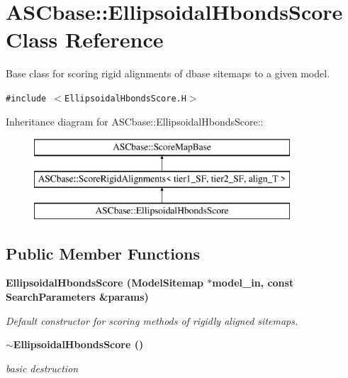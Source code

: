 \section{ASCbase::Ellipsoidal\-Hbonds\-Score Class Reference}
\label{classASCbase_1_1EllipsoidalHbondsScore}
Base class for scoring rigid alignments of dbase sitemaps to a given model.  


{\tt \#include $<$Ellipsoidal\-Hbonds\-Score.H$>$}

Inheritance diagram for ASCbase::Ellipsoidal\-Hbonds\-Score::\begin{figure}[H]
\begin{center}
\leavevmode
\includegraphics[height=3cm]{classASCbase_1_1EllipsoidalHbondsScore}
\end{center}
\end{figure}
\subsection*{Public Member Functions}
\begin{CompactItemize}
\item 
\bf{Ellipsoidal\-Hbonds\-Score} (\bf{Model\-Sitemap} $\ast$model\_\-in, const \bf{Search\-Parameters} \&params)
\begin{CompactList}\small\item\em Default constructor for scoring methods of rigidly aligned sitemaps. \item\end{CompactList}\item 
\bf{$\sim$Ellipsoidal\-Hbonds\-Score} ()\label{classASCbase_1_1EllipsoidalHbondsScore_4b6b13709f9e3ad4e9402ec26cbef0cd}

\begin{CompactList}\small\item\em basic destruction \item\end{CompactList}\end{CompactItemize}

